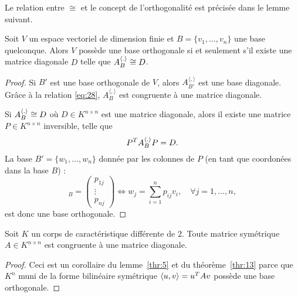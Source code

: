Le relation entre $\cong$ et le concept de l'orthogonalité   est précisée dans le lemme suivant. 
\begin{lemma}
\label{thr:13}
  Soit $V$ un espace vectoriel de dimension finie et $B = \{v_1,\dots,v_n\}$ une base quelconque. Alors $V$ possède une base orthogonale si et seulement s'il existe une matrice diagonale $D$ 
telle que 
 $A_B^{\langle {.} \rangle} \cong D$. 
\end{lemma}
\begin{proof}
Si $B'$ est une base orthogonale de $V$, alors $A_{B'}^{〈,〉}$ est une base diagonale. Grâce à la relation \eqref{eq:28}, $A_{B}^{〈,〉}$ est congruente à une matrice diagonale. 


Si $A_B^{\langle {.} \rangle} \cong D$ où $D ∈ K^{n×n}$ est une matrice diagonale, alors 
il existe une matrice $P ∈K^{n ×n}$ inversible, telle que 
\begin{displaymath}
  P^T A_B^{\langle {.} \rangle} P = D. 
\end{displaymath}
La base  $B' = \{w_1,\dots,w_n\}$ donnée par les colonnes de $P$ (en tant que coordonées dans la base $B$) :
  \begin{displaymath}
     [w_j]_B =
  \begin{pmatrix}
    p_{1j}\\ \vdots \\ p_{nj} 
  \end{pmatrix} \iff w_j = \sum_{i=1}^n p_{ij} v_i, \quad \forall j=1, \dots, n,
  \end{displaymath}
 est donc une base orthogonale. 
\end{proof}




 

\begin{corollary}
  \label{co:4}
  Soit $K$ un corps de caractéristique différente de $2$. Toute matrice symétrique  $A \in K^{n \times n}$ est congruente à une matrice diagonale. 
\end{corollary}
\begin{proof}
Ceci est un corollaire du  lemme~\ref{thr:5} et du théorème~\ref{thr:13} 
parce que  $K^n$ muni de la forme bilinéaire symétrique $\langle {u,v} \rangle = u^TAv$ possède une base orthogonale. 
\end{proof}








